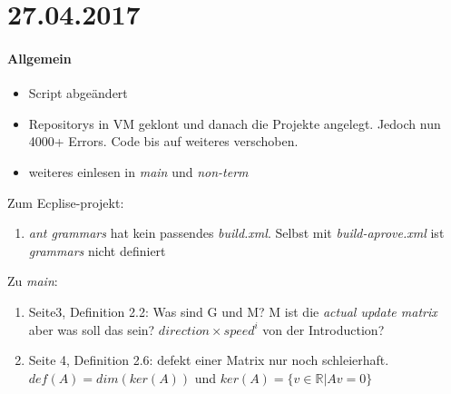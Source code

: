 \section*{27.04.2017}

\paragraph{Allgemein}
\begin{itemize}
	\item Script abgeändert
	\item Repositorys in VM geklont und danach die Projekte angelegt. Jedoch nun 4000+ Errors. Code bis auf weiteres verschoben.
	\item weiteres einlesen in \textit{main} und \textit{non-term}
\end{itemize}

Zum Ecplise-projekt:
\begin{enumerate}
	\item \emph{ant grammars} hat kein passendes \emph{build.xml}. Selbst mit \emph{build-aprove.xml} ist \emph{grammars} nicht definiert
\end{enumerate}

Zu \textit{main}:
\begin{enumerate}
	\item Seite3, Definition 2.2: Was sind G und M? M ist die \textit{\glqq actual update matrix \grqq} aber was soll das sein? $direction \times speed^i$ von der Introduction?
	\item Seite 4, Definition 2.6: defekt einer Matrix nur noch schleierhaft.\newline
	$def(A) = dim(ker(A))$ und	$ ker(A) = \{v \in \mathbb{R}| Av=0\}$
\end{enumerate}